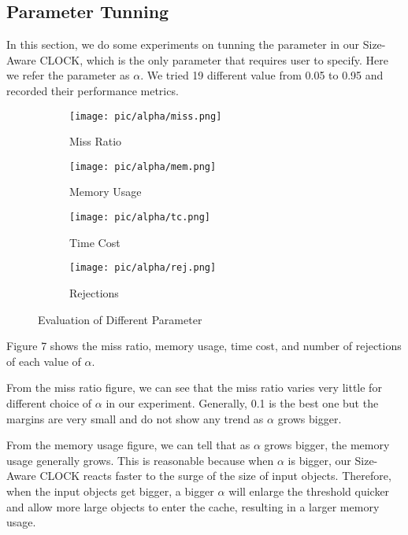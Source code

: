 \documentclass[journal,10.5pt,onecolumn]{IEEEtran}
\begin{document}
\subsection{Parameter Tunning}
In this section, we do some experiments on tunning the parameter in our Size-Aware CLOCK, which is the only parameter that requires user to specify. Here we refer the parameter as $\alpha$. We tried 19 different value from 0.05 to 0.95 and recorded their performance metrics.

\begin{figure}
  \centering
  \begin{subfigure}[h]{0.4\textwidth}
    \texttt{[image: pic/alpha/miss.png]}
    \caption{Miss Ratio}
    \label{fig:sub1}
  \end{subfigure}
  \hfill
  \begin{subfigure}[h]{0.4\textwidth}
    \texttt{[image: pic/alpha/mem.png]}
    \caption{Memory Usage}
    \label{fig:sub2}
  \end{subfigure}
  
  \medskip
  
  \begin{subfigure}[h]{0.4\textwidth}
    \texttt{[image: pic/alpha/tc.png]}
    \caption{Time Cost}
    \label{fig:sub3}
  \end{subfigure}
  \hfill
  \begin{subfigure}[h]{0.4\textwidth}
    \texttt{[image: pic/alpha/rej.png]}
    \caption{Rejections}
    \label{fig:sub4}
  \end{subfigure}
  
  \caption{Evaluation of Different Parameter}
  \label{fig:main} 
\end{figure}

Figure 7 shows the miss ratio, memory usage, time cost, and number of rejections of each value of $\alpha$.

From the miss ratio figure, we can see that the miss ratio varies very little for different choice of $\alpha$ in our experiment. Generally, 0.1 is the best one but the margins are very small and do not show any trend as $\alpha$ grows bigger.

From the memory usage figure, we can tell that as $\alpha$ grows bigger, the memory usage generally grows. This is reasonable because when $\alpha$ is bigger, our Size-Aware CLOCK reacts faster to the surge of the size of input objects. Therefore, when the input objects get bigger, a bigger $\alpha$ will enlarge the threshold quicker and allow more large objects to enter the cache, resulting in a larger memory usage.
\end{document}
